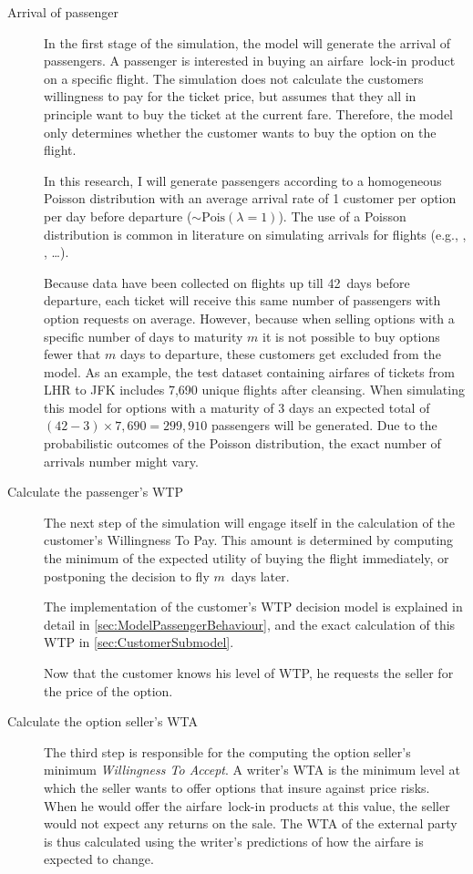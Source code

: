 \begin{description}
\item[Arrival of passenger] In the first stage of the simulation, the model will generate the arrival of passengers. A passenger is interested in buying an airfare~lock-in product on a specific flight. The simulation does not calculate the customers willingness to pay for the ticket price, but assumes that they all in principle want to buy the ticket at the current fare. Therefore, the model only determines whether the customer wants to buy the option on the flight.

In this research, I will generate passengers according to a homogeneous Poisson distribution with an average arrival rate of 1 customer per option per day before departure ($\sim \mbox{Pois}(\lambda=1)$). The use of a Poisson distribution is common in literature on simulating arrivals for flights (e.g., , , \ldots).

Because data have been collected on flights up till 42~days before departure, each ticket will receive this same number of passengers with option requests on average. However, because when selling options with a specific number of days to maturity $m$ it is not possible to buy options fewer that $m$ days to departure, these customers get excluded from the model. As an example, the test dataset containing airfares of tickets from LHR to JFK includes 7,690 unique flights after cleansing. When simulating this model for options with a maturity of 3 days an expected total of $(42 - 3) \times 7,690 = 299,910$ passengers will be generated. Due to the probabilistic outcomes of the Poisson distribution, the exact number of arrivals number might vary.

\item[Calculate the passenger's WTP] The next step of the simulation will engage itself in the calculation of the customer's Willingness To Pay. This amount is determined by computing the minimum of the expected utility of buying the flight immediately, or postponing the decision to fly $m$~days later.

The implementation of the customer's WTP decision model is explained in detail in \autoref{sec:ModelPassengerBehaviour}, and the exact calculation of this WTP in \autoref{sec:CustomerSubmodel}.

Now that the customer knows his level of WTP, he requests the seller for the price of the option.

\item[Calculate the option seller's WTA] The third step is responsible for the computing the option seller's minimum \emph{Willingness To Accept}. A writer's WTA is the minimum level at which the seller wants to offer options that insure against price risks. When he would offer the airfare~lock-in products at this value, the seller would not expect any returns on the sale. The WTA of the external party is thus calculated using the writer's predictions of how the airfare is expected to change.


\end{description}
